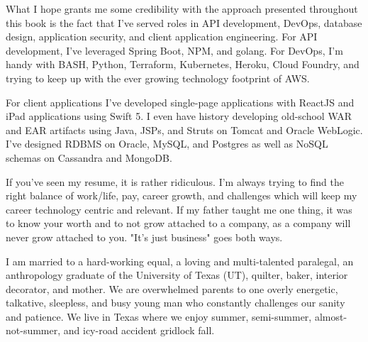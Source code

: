 What I hope grants me some credibility with the approach presented throughout this book is the fact that I've served roles in API development, DevOps, database design, application security, and client application engineering.  For API development, I've leveraged Spring Boot, NPM, and golang.  For DevOps, I'm handy with BASH, Python, Terraform, Kubernetes, Heroku, Cloud Foundry, and trying to keep up with the ever growing technology footprint of AWS.

For client applications I've developed single-page applications with ReactJS and iPad applications using Swift 5.  I even have history developing old-school WAR and EAR artifacts using Java, JSPs, and Struts on Tomcat and Oracle WebLogic.  I've designed RDBMS on Oracle, MySQL, and Postgres as well as NoSQL schemas on Cassandra and MongoDB.

If you've seen my resume, it is rather ridiculous.  I'm always trying to find the right balance of work/life, pay, career growth, and challenges which will keep my career technology centric and relevant.  If my father taught me one thing, it was to know your worth and to not grow attached to a company, as a company will never grow attached to you.  "It's just business" goes both ways.

I am married to a hard-working equal, a loving and multi-talented paralegal, an anthropology graduate of the University of Texas (UT), quilter, baker, interior decorator, and mother.  We are overwhelmed parents to one overly energetic, talkative, sleepless, and busy young man who constantly challenges our sanity and patience.  We live in Texas where we enjoy summer, semi-summer, almost-not-summer, and icy-road accident gridlock fall.
